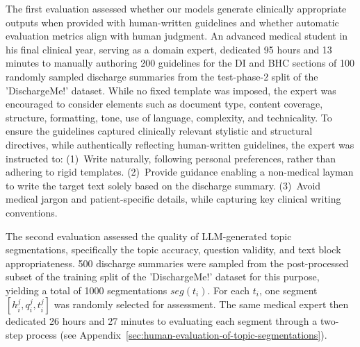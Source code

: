 The first evaluation assessed whether our models generate clinically appropriate outputs when provided with human-written guidelines and whether automatic evaluation metrics align with human judgment. An advanced medical student in his final clinical year, serving as a domain expert, dedicated 95 hours and 13 minutes to manually authoring 200 guidelines for the DI and BHC sections of 100 randomly sampled discharge summaries from the test-phase-2 split of the 'DischargeMe!' dataset.  
While no fixed template was imposed, the expert was encouraged to consider elements such as document type, content coverage, structure, formatting, tone, use of language, complexity, and technicality.
To ensure the guidelines captured clinically relevant stylistic and structural directives, while authentically reflecting human-written guidelines, the expert was instructed to: (1)~Write naturally, following personal preferences, rather than adhering to rigid templates.
(2)~Provide guidance enabling a non-medical layman to write the target text solely based on the discharge summary.
(3)~Avoid medical jargon and patient-specific details, while capturing key clinical writing conventions.

The second evaluation assessed the quality of LLM-generated topic segmentations, specifically the topic accuracy, question validity, and text block appropriateness. 500 discharge summaries were sampled from the post-processed subset of the training split of the 'DischargeMe!' dataset for this purpose, yielding a total of 1000 segmentations $seg(t_i)$. For each $t_i$,  one segment $[h_i^j, q_i^j, t_i^j]$ was randomly selected for assessment. The same medical expert then dedicated 26 hours and 27 minutes to evaluating each segment through a two-step process (see Appendix~\ref{sec:human-evaluation-of-topic-segmentations}).